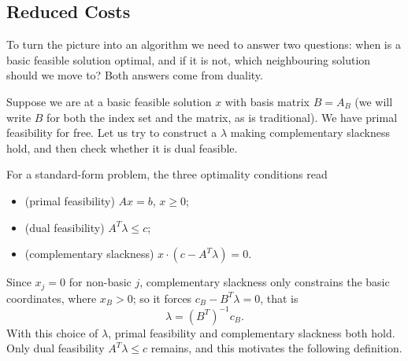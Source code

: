 \begin{center}
\end{center}

\subsection{Reduced Costs}

To turn the picture into an algorithm we need to answer two questions: when is a basic feasible solution optimal, and if it is not, which neighbouring solution should we move to? Both answers come from duality.

Suppose we are at a basic feasible solution $x$ with basis matrix $B = A_B$ (we will write $B$ for both the index set and the matrix, as is traditional). We have primal feasibility for free. Let us try to construct a $\lambda$ making complementary slackness hold, and then check whether it is dual feasible.

For a standard-form problem, the three optimality conditions read
\begin{itemize}
    \item (primal feasibility) $Ax = b$, $x \geq 0$;
    \item (dual feasibility) $A^T\lambda \leq c$;
    \item (complementary slackness) $x\cdot(c - A^T\lambda) = 0$.
\end{itemize}
Since $x_j = 0$ for non-basic $j$, complementary slackness only constrains the basic coordinates, where $x_B > 0$; so it forces $c_B - B^T\lambda = 0$, that is
$$
\lambda = (B^T)^{-1}c_B.
$$
With this choice of $\lambda$, primal feasibility and complementary slackness both hold. Only dual feasibility $A^T\lambda \leq c$ remains, and this motivates the following definition.

